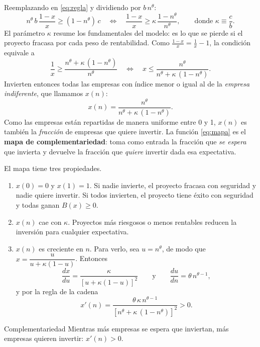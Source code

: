 \documentclass[12pt,letterpaper]{article}
\begin{document}
Reemplazando en \eqref{eq:regla} y dividiendo por $b\,n^{\theta}$:
\[
  n^{\theta}\,b\,\frac{1-x}{x}\geq(1-n^{\theta})\,c
  \quad\Longleftrightarrow\quad
  \frac{1-x}{x}\geq\kappa\,\frac{1-n^{\theta}}{n^{\theta}},
  \qquad\text{donde }\kappa\equiv\frac{c}{b}.
\]
El parámetro $\kappa$ resume los fundamentales del modelo: es lo que se pierde si el proyecto fracasa por cada peso de rentabilidad. Como $\frac{1-x}{x}=\frac{1}{x}-1$, la condición equivale a
\[
  \frac{1}{x}\geq\frac{n^{\theta}+\kappa\,(1-n^{\theta})}{n^{\theta}}
  \quad\Longleftrightarrow\quad
  x\leq\frac{n^{\theta}}{n^{\theta}+\kappa\,(1-n^{\theta})}.
\]
Invierten entonces todas las empresas con índice menor o igual al de la \emph{empresa indiferente}, que llamamos $x(n)$:
\begin{equation}\label{eq:mapa}
  x(n)=\frac{n^{\theta}}{n^{\theta}+\kappa\,(1-n^{\theta})} .
\end{equation}
Como las empresas están repartidas de manera uniforme entre 0 y 1, $x(n)$ es también la \emph{fracción} de empresas que quiere invertir. La función \eqref{eq:mapa} es el \textbf{mapa de complementariedad}: toma como entrada la fracción que \emph{se espera} que invierta y devuelve la fracción que \emph{quiere} invertir dada esa expectativa.

El mapa tiene tres propiedades.
\begin{enumerate}
  \item $x(0)=0$ y $x(1)=1$. Si nadie invierte, el proyecto fracasa con seguridad y nadie quiere invertir. Si todos invierten, el proyecto tiene éxito con seguridad y todas ganan $B(x)\geq0$.
  \item $x(n)$ cae con $\kappa$. Proyectos más riesgosos o menos rentables reducen la inversión para cualquier expectativa.
  \item $x(n)$ es creciente en $n$. Para verlo, sea $u=n^{\theta}$, de modo que $x=\dfrac{u}{u+\kappa(1-u)}$. Entonces
  \[
    \frac{dx}{du}=\frac{\kappa}{\left[u+\kappa(1-u)\right]^{2}}
    \qquad\text{y}\qquad\frac{du}{dn}=\theta\,n^{\theta-1},
  \]
  y por la regla de la cadena
  \begin{equation}\label{eq:pendiente}
    x'(n)=\frac{\theta\,\kappa\,n^{\theta-1}}{\left[n^{\theta}+\kappa\,(1-n^{\theta})\right]^{2}}>0 .
  \end{equation}
\end{enumerate}

\begin{resultado}{Complementariedad}
Mientras más empresas se espera que inviertan, más empresas quieren invertir: $x'(n)>0$.
\end{resultado}
\end{document}
